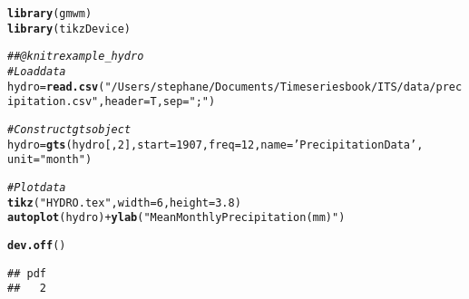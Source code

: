 \documentclass{article}\usepackage[]{graphicx}\usepackage[]{color}
\makeatletter
\newcommand{\hlnum}[1]{\textcolor[rgb]{0.686,0.059,0.569}{#1}}%
\newcommand{\hlstr}[1]{\textcolor[rgb]{0.192,0.494,0.8}{#1}}%
\newcommand{\hlcom}[1]{\textcolor[rgb]{0.678,0.584,0.686}{\textit{#1}}}%
\newcommand{\hlopt}[1]{\textcolor[rgb]{0,0,0}{#1}}%
\newcommand{\hlstd}[1]{\textcolor[rgb]{0.345,0.345,0.345}{#1}}%
\newcommand{\hlkwb}[1]{\textcolor[rgb]{0.69,0.353,0.396}{#1}}%
\newcommand{\hlkwc}[1]{\textcolor[rgb]{0.333,0.667,0.333}{#1}}%
\newcommand{\hlkwd}[1]{\textcolor[rgb]{0.737,0.353,0.396}{\textbf{#1}}}%
\newenvironment{kframe}{%
 \def\at@end@of@kframe{}%
 \ifinner\ifhmode%
  \def\at@end@of@kframe{\end{minipage}}%
  \begin{minipage}{\columnwidth}%
 \fi\fi%
 \def\FrameCommand##1{\hskip\@totalleftmargin \hskip-\fboxsep
 \colorbox{shadecolor}{##1}\hskip-\fboxsep
     \hskip-\linewidth \hskip-\@totalleftmargin \hskip\columnwidth}%
 \MakeFramed {\advance\hsize-\width
   \@totalleftmargin\z@ \linewidth\hsize
   \@setminipage}}%
 {\par\unskip\endMakeFramed%
 \at@end@of@kframe}
\newenvironment{knitrout}{}{} %
\makeatother
\begin{document}
\begin{knitrout}
\color{fgcolor}\begin{kframe}
\begin{alltt}
\hlkwd{library}\hlstd{(gmwm)}
\hlkwd{library}\hlstd{(tikzDevice)}

\hlcom{## @knitr example_hydro}
\hlcom{# Load data}
\hlstd{hydro} \hlkwb{=} \hlkwd{read.csv}\hlstd{(}\hlstr{"/Users/stephane/Documents/Time series book/ITS/data/precipitation.csv"}\hlstd{,} \hlkwc{header}\hlstd{=T,} \hlkwc{sep}\hlstd{=}\hlstr{";"}\hlstd{)}

\hlcom{# Construct gts object}
\hlstd{hydro} \hlkwb{=} \hlkwd{gts}\hlstd{(hydro[,}\hlnum{2}\hlstd{],} \hlkwc{start} \hlstd{=} \hlnum{1907}\hlstd{,} \hlkwc{freq} \hlstd{=} \hlnum{12}\hlstd{,} \hlkwc{name} \hlstd{=} \hlstr{'Precipitation Data'}\hlstd{,}
            \hlkwc{unit} \hlstd{=} \hlstr{"month"}\hlstd{)}

\hlcom{# Plot data}
\hlkwd{tikz}\hlstd{(}\hlstr{"HYDRO.tex"}\hlstd{,} \hlkwc{width} \hlstd{=} \hlnum{6}\hlstd{,} \hlkwc{height} \hlstd{=} \hlnum{3.8}\hlstd{)}
\hlkwd{autoplot}\hlstd{(hydro)}  \hlopt{+}  \hlkwd{ylab}\hlstd{(}\hlstr{"Mean Monthly Precipitation (mm)"}\hlstd{)}
\end{alltt}


{\ttfamily\noindent\color{warningcolor}{\#\# Warning: Removed 1 rows containing missing values (geom\_path).}}

{\ttfamily\noindent\color{warningcolor}{\#\# Warning: Removed 1 rows containing missing values (geom\_point).}}\begin{alltt}
\hlkwd{dev.off}\hlstd{()}
\end{alltt}
\begin{verbatim}
## pdf 
##   2
\end{verbatim}
\end{kframe}
\end{knitrout}
\end{document}

